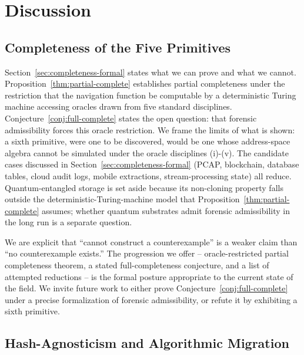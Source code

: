 \section{Discussion}
\label{sec:discussion}

\subsection{Completeness of the Five Primitives}

Section~\ref{sec:completeness-formal} states what we can prove and what we
cannot. Proposition~\ref{thm:partial-complete} establishes partial completeness
under the restriction that the navigation function be computable by a
deterministic Turing machine accessing oracles drawn from five standard
disciplines. Conjecture~\ref{conj:full-complete} states the open question:
that forensic admissibility forces this oracle restriction. We frame the
limits of what is shown: a sixth primitive, were one to be discovered,
would be one whose address-space algebra cannot be simulated under the
oracle disciplines (i)-(v). The candidate cases discussed in
Section~\ref{sec:completeness-formal} (PCAP, blockchain, database tables,
cloud audit logs, mobile extractions, stream-processing state) all reduce.
Quantum-entangled storage is set aside because its non-cloning property
falls outside the deterministic-Turing-machine model that
Proposition~\ref{thm:partial-complete} assumes; whether quantum substrates
admit forensic admissibility in the long run is a separate question.

We are explicit that ``cannot construct a counterexample'' is a weaker
claim than ``no counterexample exists.'' The progression we offer --
oracle-restricted partial completeness theorem, a stated full-completeness
conjecture, and a list of attempted reductions -- is the formal posture
appropriate to the current state of the field. We invite future work to
either prove Conjecture~\ref{conj:full-complete} under a precise
formalization of forensic admissibility, or refute it by exhibiting a
sixth primitive.

\subsection{Hash-Agnosticism and Algorithmic Migration}

